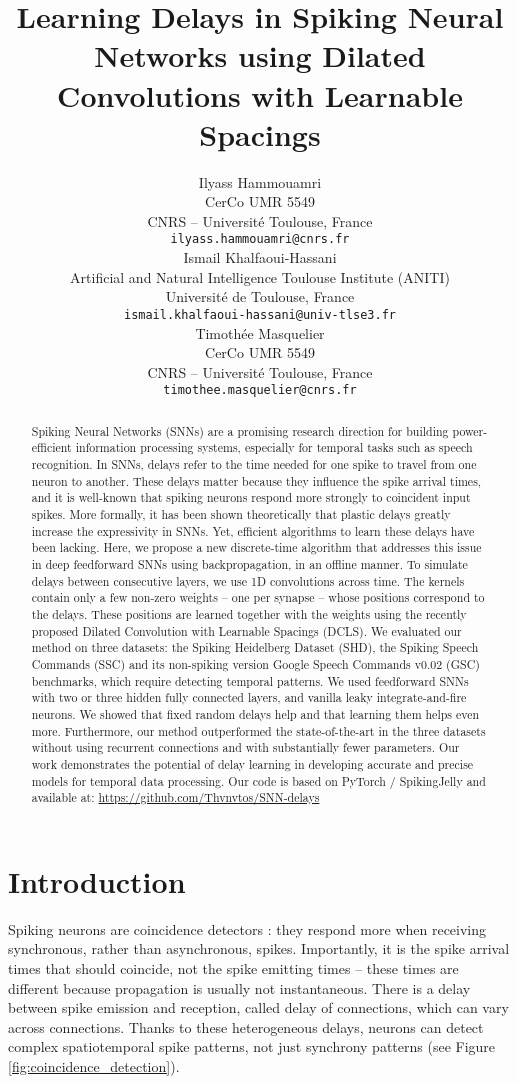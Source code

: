 \documentclass{article} \usepackage{iclr2024_conference,times}
\title{Learning Delays in Spiking Neural Networks using Dilated Convolutions with Learnable Spacings}
\author{Ilyass Hammouamri \\
CerCo UMR 5549\\
CNRS – Université Toulouse, France\\
\texttt{ilyass.hammouamri@cnrs.fr} \\
\And
Ismail Khalfaoui-Hassani \\
Artificial and Natural Intelligence Toulouse Institute (ANITI) \\
Université de Toulouse, France \\
\texttt{ismail.khalfaoui-hassani@univ-tlse3.fr} \\
\AND
Timothée Masquelier \\
CerCo UMR 5549\\
CNRS – Université Toulouse, France\\
\texttt{timothee.masquelier@cnrs.fr}
}
\begin{document}
\maketitle

\begin{abstract}
Spiking Neural Networks (SNNs) are a promising research direction for building power-efficient information processing systems, especially for temporal tasks such as speech recognition. In SNNs, delays refer to the time needed for one spike to travel from one neuron to another. These delays matter because they influence the spike arrival times, and it is well-known that spiking neurons respond more strongly to coincident input spikes. More formally, it has been shown theoretically that plastic delays greatly increase the expressivity in SNNs. Yet, efficient algorithms to learn these delays have been lacking. Here, we propose a new discrete-time algorithm that addresses this issue in deep feedforward SNNs using backpropagation, in an offline manner. To simulate delays between consecutive layers, we use 1D convolutions across time. The kernels contain only a few non-zero weights – one per synapse – whose positions correspond to the delays. These positions are learned together with the weights using the recently proposed Dilated Convolution with Learnable Spacings (DCLS). We evaluated our method on three datasets: the Spiking Heidelberg Dataset (SHD), the Spiking Speech Commands (SSC) and its non-spiking version Google Speech Commands v0.02 (GSC) benchmarks, which require detecting temporal patterns. We used feedforward SNNs with two or three hidden fully connected layers, and vanilla leaky integrate-and-fire neurons. We showed that fixed random delays help and that learning them helps even more. Furthermore, our method outperformed the state-of-the-art in the three datasets without using recurrent connections and with substantially fewer parameters. Our work demonstrates the potential of delay learning in developing accurate and precise models for temporal data processing. Our code is based on PyTorch / SpikingJelly and available at: \url{https://github.com/Thvnvtos/SNN-delays} 
\end{abstract}

\section{Introduction}

Spiking neurons are coincidence detectors \citep{Konig1996,Rossant2011}: they respond more when receiving synchronous, rather than asynchronous, spikes. Importantly, it is the spike arrival times that should coincide, not the spike emitting times --  these times are different because propagation is usually not instantaneous. There is a delay between spike emission and reception, called delay of connections, which can vary across connections. Thanks to these heterogeneous delays, neurons can detect complex spatiotemporal spike patterns, not just synchrony patterns \citep{Izhikevich2006} (see Figure \ref{fig:coincidence_detection}).
\end{document}
